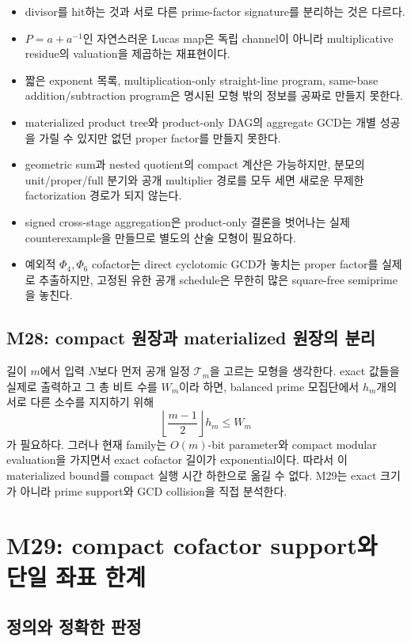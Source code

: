 \documentclass[11pt]{article}
\begin{document}
\begin{itemize}
\item divisor를 hit하는 것과 서로 다른 prime-factor signature를
  분리하는 것은 다르다.
\item \(P=a+a^{-1}\)인 자연스러운 Lucas map은 독립 channel이 아니라
  multiplicative residue의 valuation을 제곱하는 재표현이다.
\item 짧은 exponent 목록, multiplication-only straight-line program,
  same-base addition/subtraction program은 명시된 모형 밖의 정보를
  공짜로 만들지 못한다.
\item materialized product tree와 product-only DAG의 aggregate GCD는
  개별 성공을 가릴 수 있지만 없던 proper factor를 만들지 못한다.
\item geometric sum과 nested quotient의 compact 계산은 가능하지만,
  분모의 unit/proper/full 분기와 공개 multiplier 경로를 모두 세면
  새로운 무제한 factorization 경로가 되지 않는다.
\item signed cross-stage aggregation은 product-only 결론을 벗어나는
  실제 counterexample을 만들므로 별도의 산술 모형이 필요하다.
\item 예외적 \(\Phi_4,\Phi_6\) cofactor는 direct cyclotomic GCD가
  놓치는 proper factor를 실제로 추출하지만, 고정된 유한 공개
  schedule은 무한히 많은 square-free semiprime을 놓친다.
\end{itemize}

\subsection{M28: compact 원장과 materialized 원장의 분리}

길이 \(m\)에서 입력 \(N\)보다 먼저 공개 일정 \(\mathcal T_m\)을
고르는 모형을 생각한다. exact 값들을 실제로 출력하고 그 총 비트
수를 \(W_m\)이라 하면, balanced prime 모집단에서 \(h_m\)개의 서로
다른 소수를 지지하기 위해
\[
\left\lfloor\frac{m-1}{2}\right\rfloor h_m\le W_m
\]
가 필요하다. 그러나 현재 family는 \(O(m)\)-bit parameter와 compact
modular evaluation을 가지면서 exact cofactor 길이가 exponential이다.
따라서 이 materialized bound를 compact 실행 시간 하한으로 옮길 수
없다. M29는 exact 크기가 아니라 prime support와 GCD collision을
직접 분석한다.

\section{M29: compact cofactor support와 단일 좌표 한계}

\subsection{정의와 정확한 판정}
\end{document}
